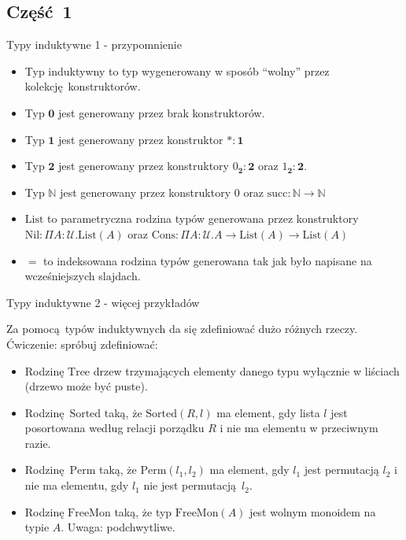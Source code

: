 \documentclass{beamer}
\newcommand{\U}{\mathcal{U}}
\begin{document}
\subsection{Część 1}

\begin{frame}{Typy induktywne 1 - przypomnienie}
\begin{itemize}
	\item Typ induktywny to typ wygenerowany w sposób ``wolny'' przez kolekcję konstruktorów.
	\item Typ $\mathbf{0}$ jest generowany przez brak konstruktorów.
	\item Typ $\mathbf{1}$ jest generowany przez konstruktor $* : \mathbf{1}$
	\item Typ $\mathbf{2}$ jest generowany przez konstruktory $0_\mathbf{2} : \mathbf{2}$ oraz $1_\mathbf{2} : \mathbf{2}$.
	\item Typ $\mathbb{N}$ jest generowany przez konstruktory $0$ oraz $\text{succ} : \mathbb{N} \to \mathbb{N}$
	\item $\text{List}$ to parametryczna rodzina typów generowana przez konstruktory $\text{Nil} : \Pi A : \U. \text{List}(A)$ oraz $\text{Cons} : \Pi A : \U. A \to \text{List}(A) \to \text{List}(A)$
	\item $=$ to indeksowana rodzina typów generowana tak jak było napisane na wcześniejszych slajdach.
\end{itemize}
\end{frame}

\begin{frame}{Typy induktywne 2 - więcej przykładów}

Za pomocą typów induktywnych da się zdefiniować dużo różnych rzeczy. Ćwiczenie: spróbuj zdefiniować:
\begin{itemize}
	\item Rodzinę $\text{Tree}$ drzew trzymających elementy danego typu wyłącznie w liściach (drzewo może być puste).
	\item Rodzinę $\text{Sorted}$ taką, że $\text{Sorted}(R, l)$ ma element, gdy lista $l$ jest posortowana według relacji porządku $R$ i nie ma elementu w przeciwnym razie.
	\item Rodzinę $\text{Perm}$ taką, że $\text{Perm}(l_1, l_2)$ ma element, gdy $l_1$ jest permutacją $l_2$ i nie ma elementu, gdy $l_1$ nie jest permutacją $l_2$.
	\item Rodzinę $\text{FreeMon}$ taką, że typ $\text{FreeMon}(A)$ jest wolnym monoidem na typie $A$. Uwaga: podchwytliwe.
\end{itemize}
\end{frame}
\end{document}
